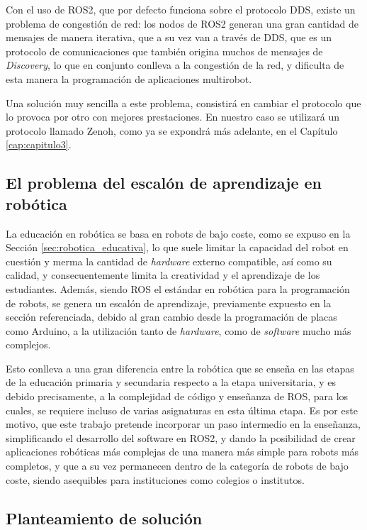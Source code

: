 Con el uso de ROS2, que por defecto funciona sobre el protocolo DDS, existe un
problema de congestión de red: los nodos de ROS2 generan una gran cantidad de
mensajes de manera iterativa, que a su vez van a través de DDS, que es un
protocolo de comunicaciones que también origina muchos de mensajes de
\textit{Discovery}, lo que en conjunto conlleva a la congestión de la red, y
dificulta de esta manera la programación de aplicaciones multirobot.

Una solución muy sencilla a este problema, consistirá en cambiar el protocolo
que lo provoca por otro con mejores prestaciones.
En nuestro caso se utilizará un protocolo llamado Zenoh, como ya se expondrá más
adelante, en el Capítulo \ref{cap:capitulo3}.


\subsection{El problema del escalón de aprendizaje en robótica}
\label{sec:problema_escalon}

La educación en robótica se basa en robots de bajo coste, como se expuso en la
Sección \ref{sec:robotica_educativa}, lo que suele limitar la capacidad del
robot en cuestión y merma la cantidad de \textit{hardware} externo compatible,
así como su calidad, y consecuentemente limita la creatividad y el aprendizaje
de los estudiantes.
Además, siendo ROS el estándar en robótica para la programación de robots,
se genera un escalón de aprendizaje, previamente expuesto en la sección
referenciada, debido al gran cambio desde la programación de placas como
Arduino, a la utilización tanto de \textit{hardware}, como de \textit{software}
mucho más complejos.

Esto conlleva a una gran diferencia entre la robótica que se enseña en las
etapas de la educación primaria y secundaria respecto a la etapa universitaria,
y es debido precisamente, a la complejidad de código y enseñanza de ROS, para
los cuales, se requiere incluso de varias asignaturas en esta última etapa.
Es por este motivo, que este trabajo pretende incorporar un paso intermedio en
la enseñanza, simplificando el desarrollo del software en ROS2, y dando la
posibilidad de crear aplicaciones robóticas más complejas de una manera más
simple para robots más completos, y que a su vez permanecen dentro de la
categoría de robots de bajo coste, siendo asequibles para instituciones como
colegios o institutos.


\subsection{Planteamiento de solución}
\label{sec:planteamiento_solucion}

